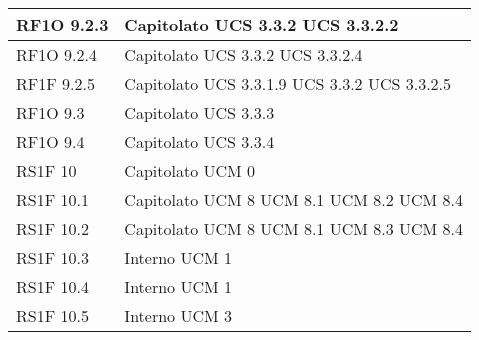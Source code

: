 \begin{center}
\begin{longtable}{ | p{5cm} | p{5cm} |}
        RF1O 9.2.3 &  Capitolato \newline  UCS 3.3.2 \newline  UCS 3.3.2.2 \newline  \\ \hline      
        RF1O 9.2.4 &  Capitolato \newline  UCS 3.3.2 \newline  UCS 3.3.2.4 \newline  \\ \hline      
        RF1F 9.2.5 &  Capitolato \newline  UCS 3.3.1.9 \newline  UCS 3.3.2 \newline  UCS 3.3.2.5 \newline  \\ \hline      
        RF1O 9.3 &  Capitolato \newline  UCS 3.3.3 \newline  \\ \hline      
        RF1O 9.4 &  Capitolato \newline  UCS 3.3.4 \newline  \\ \hline      
        RS1F 10 &  Capitolato \newline  UCM 0 \newline  \\ \hline      
        RS1F 10.1 &  Capitolato \newline  UCM 8 \newline  UCM 8.1 \newline  UCM 8.2 \newline  UCM 8.4 \newline  \\ \hline      
        RS1F 10.2 &  Capitolato \newline  UCM 8 \newline  UCM 8.1 \newline  UCM 8.3 \newline  UCM 8.4 \newline  \\ \hline      
        RS1F 10.3 &  Interno \newline  UCM 1 \newline  \\ \hline      
        RS1F 10.4 &  Interno \newline  UCM 1 \newline  \\ \hline      
        RS1F 10.5 &  Interno \newline  UCM 3 \newline  \\ \hline      

\end{longtable}
\end{center}
